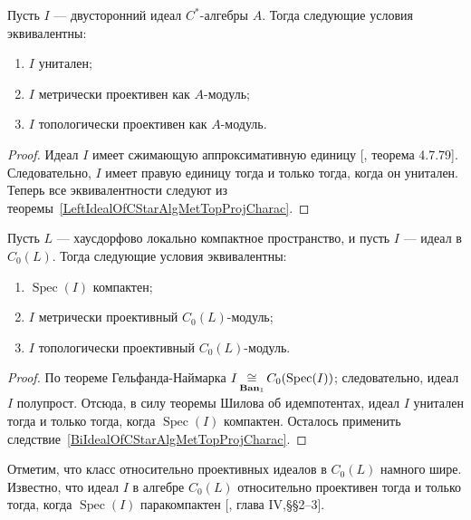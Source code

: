 \begin{corollary}\label{BiIdealOfCStarAlgMetTopProjCharac} Пусть $I$ ---
двусторонний идеал $C^*$-алгебры $A$. Тогда следующие условия эквивалентны:
\begin{enumerate}[label = (\roman*)]
    \item $I$ унитален;

    \item $I$ метрически проективен как $A$-модуль;

    \item $I$ топологически проективен как $A$-модуль.
\end{enumerate}
\end{corollary}
\begin{proof} Идеал $I$ имеет сжимающую аппроксимативную единицу
[\cite{HelBanLocConvAlg}, теорема 4.7.79]. Следовательно, $I$ имеет правую
единицу тогда и только тогда, когда он унитален. Теперь все эквивалентности
следуют из теоремы~\ref{LeftIdealOfCStarAlgMetTopProjCharac}. 
\end{proof}

\begin{corollary}\label{IdealofCommCStarAlgMetTopProjCharac} Пусть $L$ ---
хаусдорфово локально компактное пространство, и пусть $I$ --- идеал в $C_0(L)$.
Тогда следующие условия эквивалентны:
\begin{enumerate}[label = (\roman*)]
    \item $\operatorname{Spec}(I)$ компактен;

    \item $I$ метрически проективный $C_0(L)$-модуль;

    \item $I$ топологически проективный $C_0(L)$-модуль.
\end{enumerate} 
\end{corollary}
\begin{proof} По теореме Гельфанда-Наймарка
$I\mathop{\mathbin{\cong}}\limits_{\mathbf{Ban}_1}C_0(\operatorname{Spec}(I))$; следовательно, идеал $I$
полупрост. Отсюда, в силу теоремы Шилова об идемпотентах, идеал $I$ унитален
тогда и только тогда, когда $\operatorname{Spec}(I)$ компактен. Осталось
применить следствие~\ref{BiIdealOfCStarAlgMetTopProjCharac}. 
\end{proof}

Отметим, что класс относительно проективных идеалов в $C_0(L)$ намного шире.
Известно, что идеал $I$ в алгебре $C_0(L)$ относительно проективен тогда и
только тогда, когда $\operatorname{Spec}(I)$ паракомпактен
[\cite{HelHomolBanTopAlg}, глава IV,\S\S 2--3].

